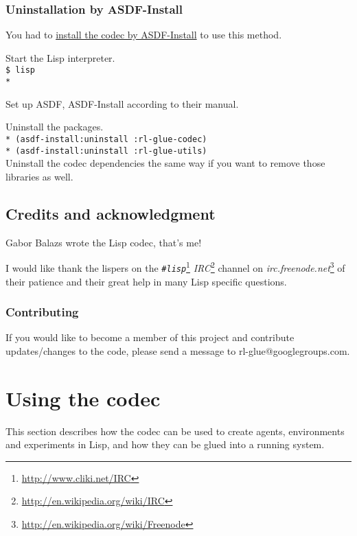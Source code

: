 \documentclass[11pt,a4paper,dvipdfm]{article}
\newcommand{\selfref}[1]{\href{#1}{#1}}
\newcommand{\footref}[2]{\textsl{#1}\footnote{\selfref{#2}}}
\newcommand{\prompttext}[1]{\texttt{#1}}
\newcommand{\shprompt}[1]{\prompttext{\$ #1}}
\newcommand{\lispprompt}[1]{\prompttext{* #1}}
\begin{document}
\subsubsection{Uninstallation by ASDF-Install}

You had to \hyperlink{asdfinst}{install the codec by ASDF-Install} to use this
method.

Start the Lisp interpreter. \\
\shprompt{lisp} \\
\lispprompt{}

Set up ASDF, ASDF-Install according to their manual.

Uninstall the packages. \\
\lispprompt{(asdf-install:uninstall :rl-glue-codec)} \\
\lispprompt{(asdf-install:uninstall :rl-glue-utils)} \\
Uninstall the codec dependencies the same way if you want to remove those
libraries as well.

\subsection{Credits and acknowledgment}

Gabor Balazs wrote the Lisp codec, that's me!

I would like thank the lispers on the
\footref{\prompttext{\#lisp}}{http://www.cliki.net/IRC}
\footref{IRC}{http://en.wikipedia.org/wiki/IRC} channel on
\footref{irc.freenode.net}{http://en.wikipedia.org/wiki/Freenode}
of their patience and their great help in many Lisp specific questions.

\subsubsection{Contributing}

If you would like to become a member of this project and contribute 
updates/changes to the code, please send a message to rl-glue@googlegroups.com.


\section{Using the codec}

This section describes how the codec can be used to create agents, environments
and experiments in Lisp, and how they can be glued into a running system.
\end{document}
